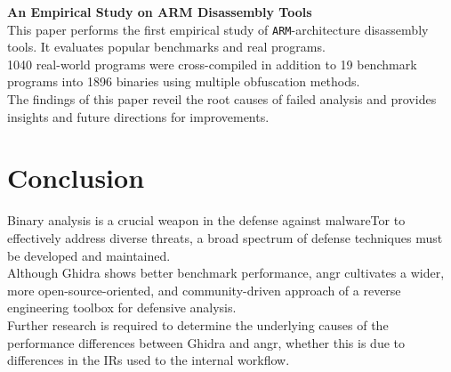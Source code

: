 \documentclass[seminar]{plai}
\begin{document}
\noindent\textbf{An Empirical Study on ARM Disassembly Tools}\\
This paper performs the first empirical study of \texttt{ARM}-architecture disassembly tools. It evaluates popular benchmarks and real programs.\\
1040 real-world programs were cross-compiled in addition to 19 benchmark programs into 1896 binaries using multiple obfuscation methods.\\
The findings of this paper reveil the root causes of failed analysis and provides insights and future directions for improvements.\cite{an-empirical-study-on-ARM-disassembly-disassembly-tools} 

\section{Conclusion}
\label{sec:conclusion}
Binary analysis is a crucial weapon in the defense against malwareTor to effectively address diverse threats, a broad spectrum of defense techniques must be developed and maintained.\\
Although Ghidra shows better benchmark performance, angr cultivates a wider, more open-source-oriented, and community-driven approach of a reverse engineering toolbox for defensive analysis.\\
Further research is required to determine the underlying causes of the performance differences between Ghidra and angr, whether this is due to differences in the IRs used to the internal workflow. 


\end{document}
